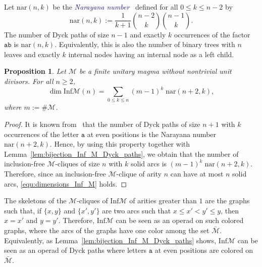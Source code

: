 \documentclass[10pt,reqno]{amsart}
\numberwithin{equation}{subsection}
\renewcommand{\leq}{\leqslant}
\renewcommand{\geq}{\geqslant}
\newtheorem{Proposition}[Theorem]{Proposition}
\newcommand{\Mca}{\mathcal{M}}
\newcommand{\Att}{\mathtt{a}}
\newcommand{\Btt}{\mathtt{b}}
\newcommand{\Inf}{\mathrm{Inf}}
\newcommand{\Nar}{\mathrm{nar}}
\newcommand{\Def}[1]{\textcolor{MidnightBlue}{\em #1}}
\begin{document}
\medskip

Let $\Nar(n, k)$ be the \Def{Narayana number}~\cite{Nar55} defined
for all $0 \leq k \leq n - 2$ by
\begin{equation}
    \Nar(n, k) := \frac{1}{k + 1} \binom{n - 2}{k} \binom{n - 1}{k}.
\end{equation}
The number of Dyck paths of size $n - 1$ and exactly $k$ occurrences of
the factor $\Att \Btt$ is $\Nar(n, k)$. Equivalently, this is also the
number of binary trees with $n$ leaves and exactly $k$ internal nodes
having an internal node as a left child.
\medskip

\begin{Proposition} \label{prop:dimensions_Inf_M}
    Let $\Mca$ be a finite unitary magma without nontrivial unit
    divisors. For all $n \geq 2$,
    \begin{equation} \label{equ:dimensions_Inf_M}
        \dim \Inf\Mca(n) =
        \sum_{0 \leq k \leq n}
        (m - 1)^k \; \Nar(n + 2, k),
    \end{equation}
    where $m := \# \Mca$.
\end{Proposition}
\begin{proof}
    It is known from~\cite{Sul98} that the number of Dyck paths of size
    $n + 1$ with $k$ occurrences of the letter $\Att$ at even positions
    is the Narayana number $\Nar(n + 2, k)$. Hence, by using this
    property together with Lemma~\ref{lem:bijection_Inf_M_Dyck_paths},
    we obtain that the number of inclusion-free $\Mca$-cliques of size
    $n$ with $k$ solid arcs is $(m - 1)^k \; \Nar(n + 2, k)$. Therefore,
    since an inclusion-free $\Mca$-clique of arity $n$ can have at most
    $n$ solid arcs, \eqref{equ:dimensions_Inf_M} holds.
\end{proof}
\medskip

The skeletons of the $\Mca$-cliques of $\Inf\Mca$ of arities greater
than $1$ are the graphs such that, if $\{x, y\}$ and $\{x', y'\}$ are
two arcs such that $x \leq x' < y' \leq y$, then $x = x'$ and $y = y'$.
Therefore, $\Inf\Mca$ can be seen as an operad on such colored graphs,
where the arcs of the graphs have one color among the set $\bar{\Mca}$.
Equivalently, as Lemma~\ref{lem:bijection_Inf_M_Dyck_paths} shows,
$\Inf\Mca$ can be seen as an operad of Dyck paths where letters $\Att$
at even positions are colored on~$\bar{\Mca}$.
\medskip
\end{document}
